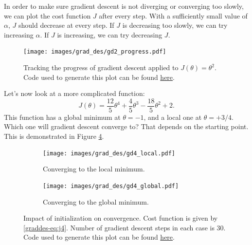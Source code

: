 \documentclass{article}
\theoremstyle{definition}
\begin{document}
In order to make sure gradient descent is not diverging or converging too slowly, we can plot the cost function $J$ after every step. With a sufficiently small value of $\alpha$, $J$ should decrease at every step. If $J$ is decreasing too slowly, we can try increasing $\alpha$. If $J$ is increasing, we can try decreasing $J$. 

\begin{figure}[ht]
\centering
\texttt{[image: images/grad\_des/gd2\_progress.pdf]}
\caption{Tracking the progress of gradient descent applied to  $J(\theta)=\theta^2$. Code used to generate this plot can be found \href{https://github.com/siavashaslanbeigi/ml_notes/blob/master/src/grad_des/basics.ipynb}{\color{blue} here}.}
\label{graddes-fig:gd2-progress}
\end{figure}

Let's now look at a more complicated function:
\begin{equation}
   J(\theta) = \frac{12}{5} \theta^4 + \frac{4}{5} \theta^3 - \frac{18}{5} \theta^2 + 2.
   \label{graddes-eq:j4}
\end{equation}
This function has a global minimum at $\theta=-1$, and a local one at $\theta=+3/4$. Which one will gradient descent converge to? That depends on the starting point. This is demonstrated in Figure \ref{graddes-fig:gd4-init}.

\begin{figure}[ht]
    \begin{subfigure}[ht]{\linewidth}
        \centering
        \texttt{[image: images/grad\_des/gd4\_local.pdf]}
        \caption{Converging to the local minimum.}
        \label{graddes-fig:gd4-local}
    \end{subfigure}%
    
    \begin{subfigure}[ht]{\linewidth}
        \centering
        \texttt{[image: images/grad\_des/gd4\_global.pdf]}
        \caption{Converging to the global minimum.}
        \label{graddes-fig:gd4-global}
    \end{subfigure}%
    
    \caption{Impact of initialization on convergence. Cost function is given by \eqref{graddes-eq:j4}. Number of gradient descent steps in each case is 30. Code used to generate this plot can be found \href{https://github.com/siavashaslanbeigi/ml_notes/blob/master/src/grad_des/basics.ipynb}{\color{blue} here}.}
    \label{graddes-fig:gd4-init}
\end{figure}
\end{document}
